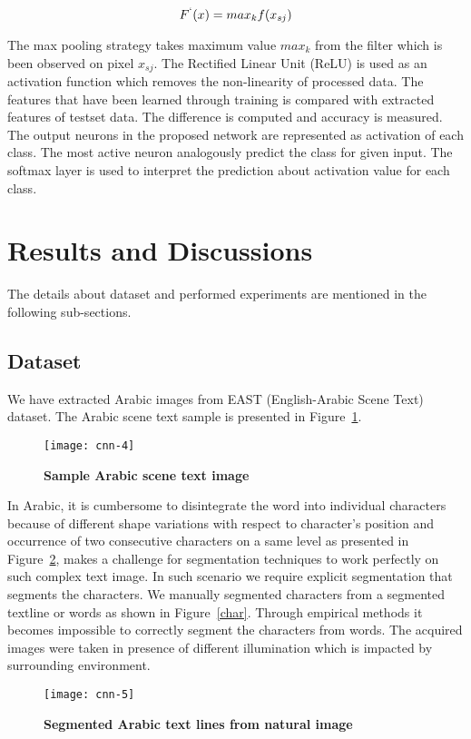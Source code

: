 \documentclass[conference]{IEEEtran}
\begin{document}
\begin{equation}
F^{`}(x)= max_k f(x_{sj})
\end{equation}

The max pooling strategy takes maximum value $max_k$ from the filter which is been observed on pixel $x_{sj}$.
The Rectified Linear Unit (ReLU) is used as an activation function which removes the non-linearity of processed data.
The features that have been learned through training is compared with extracted features of testset data.
The difference is computed and accuracy is measured.
The output neurons in the proposed network are represented as activation of each class.
The most active neuron analogously predict the class for given input.
The softmax layer is used to interpret the prediction about activation value for each class.



\section{Results and Discussions}
The details about dataset and performed experiments are mentioned in the following sub-sections.

\subsection{Dataset}
We have extracted Arabic images from EAST (English-Arabic Scene Text) dataset.
The Arabic scene text sample is presented in Figure~\ref{sample}.

\begin{figure}[H]
\centering
\texttt{[image: cnn-4]}
\caption{\bf Sample Arabic scene text image}
\label{sample}
\end{figure}
In Arabic, it is cumbersome to disintegrate the word into individual characters because of different shape variations with respect to character's position and occurrence of two consecutive characters on a same level as presented in Figure~\ref{segmented}, makes a challenge for segmentation techniques to work perfectly on such complex text image.
In such scenario we require explicit segmentation that segments the characters.
We manually segmented characters from a segmented textline or words as shown in Figure~\ref{char}.
Through empirical methods it becomes impossible to correctly segment the characters from words.
The acquired images were taken in presence of different illumination which is impacted by surrounding environment.
\begin{figure}[H]
\centering
\texttt{[image: cnn-5]}
\caption{\bf Segmented Arabic text lines from natural image}
\label{segmented}
\end{figure}
\end{document}

